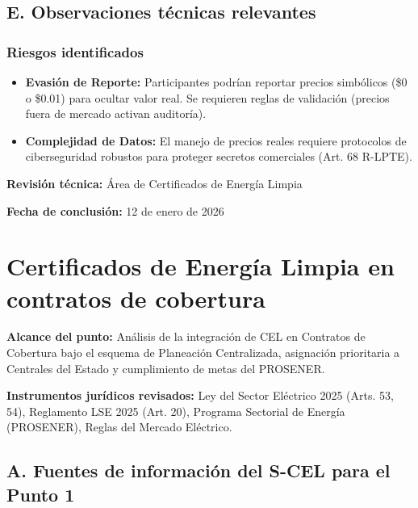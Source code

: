 \documentclass{cel}
\begin{document}
\subsection{E. Observaciones técnicas relevantes}
\nopagebreak

\subsubsection{Riesgos identificados}
\nopagebreak

\begin{itemize}
\item \textbf{Evasión de Reporte:} Participantes podrían reportar precios simbólicos (\$0 o \$0.01) para ocultar valor real. Se requieren reglas de validación (precios fuera de mercado activan auditoría).
\item \textbf{Complejidad de Datos:} El manejo de precios reales requiere protocolos de ciberseguridad robustos para proteger secretos comerciales (Art. 68 R-LPTE).


\end{itemize}
\textbf{Revisión técnica:} Área de Certificados de Energía Limpia

\textbf{Fecha de conclusión:} 12 de enero de 2026


\clearpage
{}
{}
\section*{Certificados de Energía Limpia en contratos de cobertura}
\nopagebreak

\textbf{Alcance del punto:} Análisis de la integración de CEL en Contratos de Cobertura bajo el esquema de Planeación Centralizada, asignación prioritaria a Centrales del Estado y cumplimiento de metas del PROSENER.

\textbf{Instrumentos jurídicos revisados:} Ley del Sector Eléctrico 2025 (Arts. 53, 54), Reglamento LSE 2025 (Art. 20), Programa Sectorial de Energía (PROSENER), Reglas del Mercado Eléctrico.


\vspace{0.4cm}
\subsection{A. Fuentes de información del S-CEL para el Punto 1}
\nopagebreak
\end{document}
